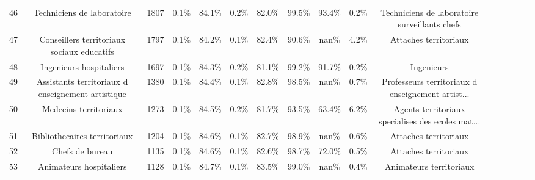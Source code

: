 \documentclass[10pt]{article}
\begin{document}
\begin{landscape}
\begin{longtable}{ | p{0.5cm} |*{15}{c|} }
46  &                         Techniciens de laboratoire &           1807 &           0.1\% &                  84.1\% &                 0.2\% &                    82.0\% &              99.5\% &                             93.4\% &                                     0.2\% &      Techniciens de laboratoire surveillants chefs \\
47  &         Conseillers territoriaux sociaux educatifs &           1797 &           0.1\% &                  84.2\% &                 0.1\% &                    82.4\% &              90.6\% &                              nan\% &                                     4.2\% &                              Attaches territoriaux \\
48  &                            Ingenieurs hospitaliers &           1697 &           0.1\% &                  84.3\% &                 0.2\% &                    81.1\% &              99.2\% &                             91.7\% &                                     0.2\% &                                         Ingenieurs \\
49  &  Assistants territoriaux d enseignement artistique &           1380 &           0.1\% &                  84.4\% &                 0.1\% &                    82.8\% &              98.5\% &                              nan\% &                                     0.7\% &  Professeurs territoriaux d enseignement artist... \\
50  &                              Medecins territoriaux &           1273 &           0.1\% &                  84.5\% &                 0.2\% &                    81.7\% &              93.5\% &                             63.4\% &                                     6.2\% &  Agents territoriaux specialises des ecoles mat... \\
51  &                       Bibliothecaires territoriaux &           1204 &           0.1\% &                  84.6\% &                 0.1\% &                    82.7\% &              98.9\% &                              nan\% &                                     0.6\% &                              Attaches territoriaux \\
52  &                                    Chefs de bureau &           1135 &           0.1\% &                  84.6\% &                 0.1\% &                    82.6\% &              98.7\% &                             72.0\% &                                     0.5\% &                              Attaches territoriaux \\
53  &                            Animateurs hospitaliers &           1128 &           0.1\% &                  84.7\% &                 0.1\% &                    83.5\% &              99.0\% &                              nan\% &                                     0.4\% &                            Animateurs territoriaux \\

\end{longtable}
\end{landscape}
\end{document}
